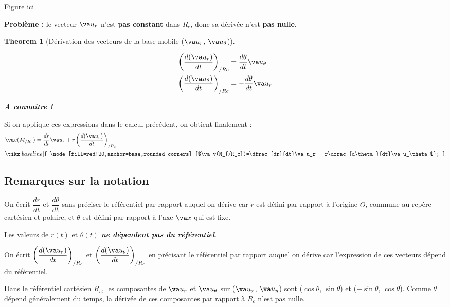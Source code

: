 \documentclass[
  12pt,
  openany]{book}
\theoremstyle{plain}
\newtheorem{theorem}{Theorem}[section]
\theoremstyle{remark}
\begin{document}
Figure ici

\textbf{Problème :} le vecteur \(\va u_r\) n'est \textbf{pas constant}
dans \(R_c\), donc sa dérivée n'est \textbf{pas nulle}.

\begin{theorem}[Dérivation des vecteurs de la base mobile (\(\va u_r\),
\(\va u_\theta\))]\protect\hypertarget{thm-derivation}{}\label{thm-derivation}

\begin{align*}
  \left(\frac{d(\va u_r)}{dt}\right)_{/Rc} &= \frac{d\theta}{dt}\va u_\theta\\
  \left(\frac{d(\va u_\theta)}{dt}\right)_{/Rc} &= -\frac{d\theta}{dt}\va u_r
\end{align*}

\textbf{A connaître !}

\end{theorem}

Si on applique ces expressions dans le calcul précédent, on obtient
finalement : \begin{align*}
    &\va v(M_{/R_c})=\frac{dr}{dt}\va u_r + r\left(\frac{d(\va u_r)}{dt}\right)_{/R_c}\\
    &\tikz[baseline]{
            \node[fill=red!20,anchor=base,rounded corners]
            {$\va v(M_{/R_c})=\dfrac{dr}{dt}\va u_r + r\dfrac{d\theta}{dt}\va u_\theta$};
        } 
\end{align*}

\subsection{Remarques sur la notation}\label{remarques-sur-la-notation}

On écrit \(\dfrac{dr}{dt}\) et \(\dfrac{d\theta}{dt}\) sans préciser le
référentiel par rapport auquel on dérive car \(r\) est défini par
rapport à l'origine \(O\), commune au repère cartésien et polaire, et
\(\theta\) est défini par rapport à l'axe \(\va x\) qui est fixe.

Les valeurs de \(r(t)\) et \(\theta(t)\) \textbf{\emph{ne dépendent pas
du référentiel}}.

On écrit \(\left(\dfrac{d(\va u_r)}{dt}\right)_{/R_c}\) et
\(\left(\dfrac{d(\va u_\theta)}{dt}\right)_{/R_c}\) en précisant le
référentiel par rapport auquel on dérive car l'expression de ces
vecteurs dépend du référentiel.

Dans le référentiel cartésien \(R_c\), les composantes de \(\va u_r\) et
\(\va u_\theta\) sur (\(\va u_x\), \(\va u_y\)) sont (\(\cos{\theta}\),
\(\sin{\theta}\)) et (\(-\sin{\theta}\), \(\cos{\theta}\)). Comme
\(\theta\) dépend généralement du temps, la dérivée de ces composantes
par rapport à \(R_c\) n'est pas nulle.
\end{document}
